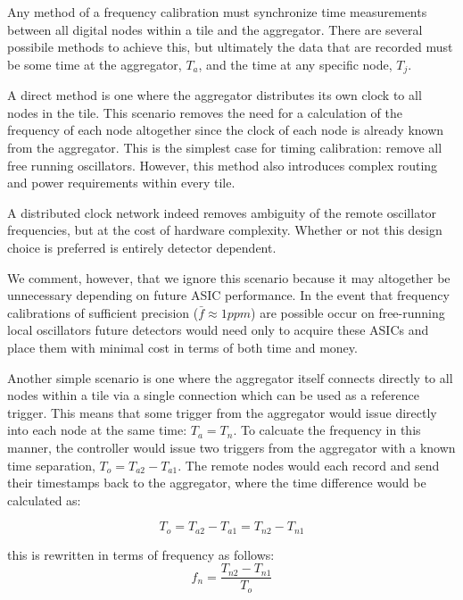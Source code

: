 Any method of a frequency calibration must synchronize time measurements between all digital nodes within a tile and the aggregator.
There are several possibile methods to achieve this, but ultimately the data that are recorded must be some time at the aggregator, $T_{a}$, and the time at any specific node, $T_{j}$.

A direct method is one where the aggregator distributes its own clock to all nodes in the tile.
This scenario removes the need for a calculation of the frequency of each node altogether since the clock of each node is already known from the aggregator.
This is the simplest case for timing calibration: remove all free running oscillators.
However, this method also introduces complex routing and power requirements within every tile.

A distributed clock network indeed removes ambiguity of the remote oscillator frequencies, but at the cost of hardware complexity.
Whether or not this design choice is preferred is entirely detector dependent.

We comment, however, that we ignore this scenario because it may altogether be unnecessary depending on future ASIC performance.
In the event that frequency calibrations of sufficient precision ($\bar{f} \approx 1 ppm$) are possible occur on free-running local oscillators future detectors would need only to acquire these ASICs and place them with minimal cost in terms of both time and money.

Another simple scenario is one where the aggregator itself connects directly to all nodes within a tile via a single connection which can be used as a reference trigger.
This means that some trigger from the aggregator would issue directly into each node at the same time: $T_{a} = T_{n}$.
To calcuate the frequency in this manner, the controller would issue two triggers from the aggregator with a known time separation, $T_{o} = T_{a2} - T_{a1}$.
The remote nodes would each record and send their timestamps back to the aggregator, where the time difference would be calculated as:

\begin{equation}
  T_{o} = T_{a2} - T_{a1} = T_{n2} - T_{n1}
\end{equation}

this is rewritten in terms of frequency as follows:
\begin{equation}
  f_{n} = \frac{T_{n2} - T_{n1}}{T_{o}}
\end{equation}

